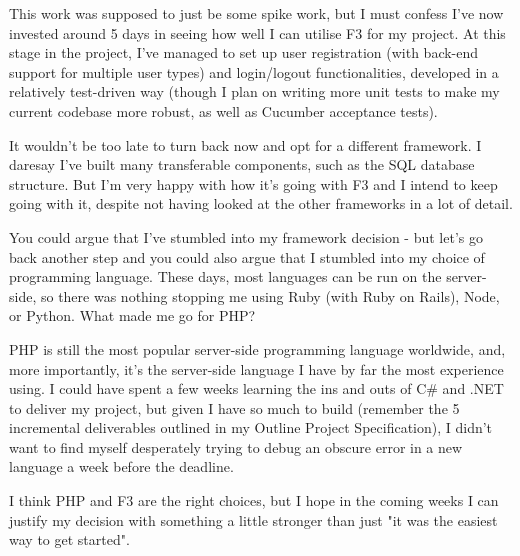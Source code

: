 This work was supposed to just be some spike work, but I must confess I've now invested around 5 days in seeing how well I can utilise F3 for my project. At this stage in the project, I've managed to set up user registration (with back-end support for multiple user types) and login/logout functionalities, developed in a relatively test-driven way (though I plan on writing more unit tests to make my current codebase more robust, as well as Cucumber acceptance tests).

It wouldn't be too late to turn back now and opt for a different framework. I daresay I've built many transferable components, such as the SQL database structure. But I'm very happy with how it's going with F3 and I intend to keep going with it, despite not having looked at the other frameworks in a lot of detail.

You could argue that I've stumbled into my framework decision - but let's go back another step and you could also argue that I stumbled into my choice of programming language. These days, most languages can be run on the server-side, so there was nothing stopping me using Ruby (with Ruby on Rails), Node, or Python. What made me go for PHP?

PHP is still the most popular server-side programming language worldwide, and, more importantly, it's the server-side language I have by far the most experience using. I could have spent a few weeks learning the ins and outs of C\# and .NET to deliver my project, but given I have so much to build (remember the 5 incremental deliverables outlined in my Outline Project Specification), I didn't want to find myself desperately trying to debug an obscure error in a new language a week before the deadline.

I think PHP and F3 are the right choices, but I hope in the coming weeks I can justify my decision with something a little stronger than just "it was the easiest way to get started".